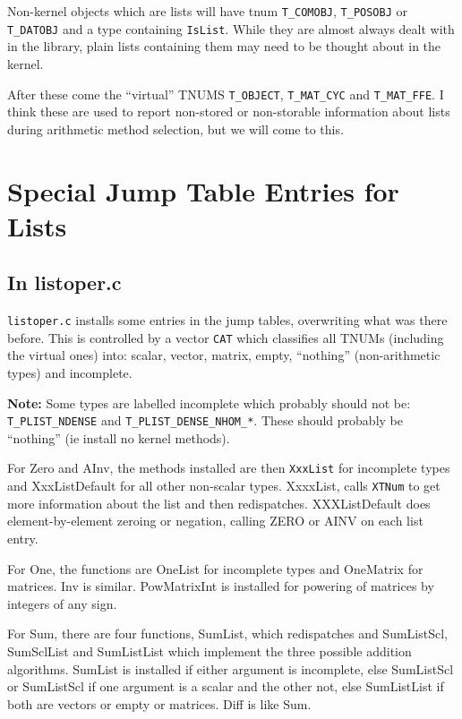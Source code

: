 \documentclass{article}
\begin{document}
Non-kernel objects which are lists will have tnum \verb|T_COMOBJ|,
\verb|T_POSOBJ| or \verb|T_DATOBJ| and a type containing
\verb|IsList|. While they are almost always dealt with in the library,
plain lists containing them may need to be thought about in the
kernel.

After these come the ``virtual'' TNUMS \verb|T_OBJECT|, \verb|T_MAT_CYC| and
\verb|T_MAT_FFE|. I think these are used to report non-stored or
non-storable information about lists during arithmetic method
selection, but we will come to this.

\section{Special Jump Table Entries for Lists}

\subsection{In listoper.c}

\verb|listoper.c| installs some entries in the jump tables,
overwriting what was there before. This is controlled by a vector
\verb|CAT| which classifies all TNUMs (including the virtual ones)
into: scalar, vector, matrix, empty, ``nothing'' (non-arithmetic types)
and incomplete.

\textbf{Note:} Some types are labelled incomplete which probably
should not be: \verb|T_PLIST_NDENSE| and \verb|T_PLIST_DENSE_NHOM_*|. These should
probably be ``nothing'' (ie install no kernel methods). 

For Zero and AInv, the methods installed are then \verb|XxxList| for
incomplete types and XxxListDefault for all other non-scalar types. 
XxxxList, calls \verb|XTNum| to get more information about the list
and then redispatches. XXXListDefault does element-by-element zeroing
or negation, calling ZERO or AINV on each list entry. 

For One, the functions are OneList for incomplete types and OneMatrix
for matrices. Inv is similar. PowMatrixInt is installed for powering
of matrices by integers of any sign. 

For Sum, there are four functions, SumList, which redispatches and
SumListScl, SumSclList and SumListList which implement the three
possible addition algorithms. SumList is installed if either argument
is incomplete, else SumListScl or SumListScl if one argument is a
scalar and the other not, else SumListList if both are vectors or
empty or matrices. Diff is like Sum.
\end{document}
